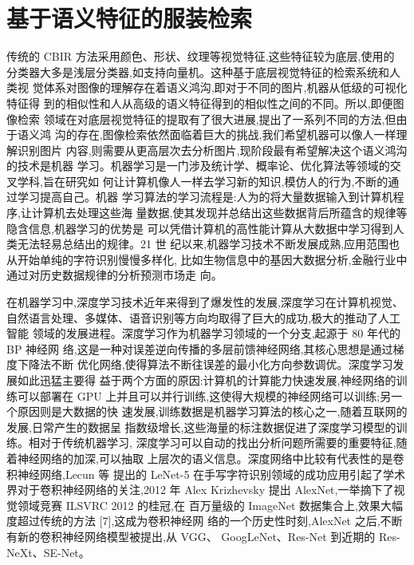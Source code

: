 \section{基于语义特征的服装检索}
传统的 CBIR 方法采用颜色、形状、纹理等视觉特征,这些特征较为底层,使用的
分类器大多是浅层分类器,如支持向量机。这种基于底层视觉特征的检索系统和人类视
觉体系对图像的理解存在着语义鸿沟,即对于不同的图片,机器从低级的可视化特征得
到的相似性和人从高级的语义特征得到的相似性之间的不同\cite{卢兴敬2008基于内容的服装图像检索技术研究及实现}。所以,即便图像检索
领域在对底层视觉特征的提取有了很大进展,提出了一系列不同的方法,但由于语义鸿
沟的存在,图像检索依然面临着巨大的挑战,我们希望机器可以像人一样理解识别图片
内容,则需要从更高层次去分析图片,现阶段最有希望解决这个语义鸿沟的技术是机器
学习。机器学习是一门涉及统计学、概率论、优化算法等领域的交叉学科,旨在研究如
何让计算机像人一样去学习新的知识,模仿人的行为,不断的通过学习提高自己。机器
学习算法的学习流程是:人为的将大量数据输入到计算机程序,让计算机去处理这些海
量数据,使其发现并总结出这些数据背后所蕴含的规律等隐含信息,机器学习的优势是
可以凭借计算机的高性能计算从大数据中学习得到人类无法轻易总结出的规律。21 世
纪以来,机器学习技术不断发展成熟,应用范围也从开始单纯的字符识别慢慢多样化,
比如生物信息中的基因大数据分析,金融行业中通过对历史数据规律的分析预测市场走
向。

在机器学习中,深度学习技术近年来得到了爆发性的发展,深度学习在计算机视觉、
自然语言处理、多媒体、语音识别等方向均取得了巨大的成功,极大的推动了人工智能
领域的发展进程。深度学习作为机器学习领域的一个分支,起源于 80 年代的 BP \cite{rumelhart1988learning}神经网
络,这是一种对误差逆向传播的多层前馈神经网络,其核心思想是通过梯度下降法不断
优化网络,使得算法不断往误差的最小化方向参数调优。深度学习发展如此迅猛主要得
益于两个方面的原因:计算机的计算能力快速发展,神经网络的训练可以部署在 GPU
上并且可以并行训练,这使得大规模的神经网络可以训练;另一个原因则是大数据的快
速发展,训练数据是机器学习算法的核心之一,随着互联网的发展,日常产生的数据呈
指数级增长,这些海量的标注数据促进了深度学习模型的训练。相对于传统机器学习,
深度学习可以自动的找出分析问题所需要的重要特征,随着神经网络的加深,可以抽取
上层次的语义信息。深度网络中比较有代表性的是卷积神经网络,Lecun 等 提出的
LeNet-5\cite{lecun1998gradient} 在手写字符识别领域的成功应用引起了学术界对于卷积神经网络的关注,2012
年 Alex Krizhevsky 提出 AlexNet\cite{krizhevsky2012imagenet},一举摘下了视觉领域竞赛 ILSVRC 2012 的桂冠,在
百万量级的 ImageNet\cite{deng2009imagenet} 数据集合上,效果大幅度超过传统的方法 [7],这成为卷积神经网
络的一个历史性时刻,AlexNet 之后,不断有新的卷积神经网络模型被提出,从 VGG\cite{simonyan2014very}、
GoogLeNet\cite{szegedy2015going}、Res-Net\cite{he2016deep} 到近期的 Res-NeXt\cite{xie2017aggregated}、SE-Net\cite{hu2018squeeze}。

